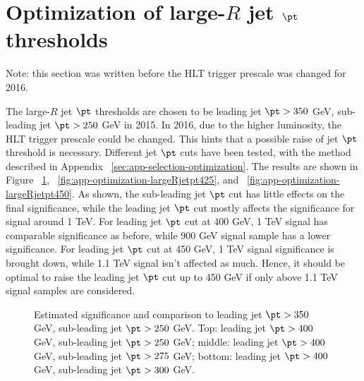 \section{Optimization of large-$R$ jet $\pt$ thresholds}
\label{sec:app-optimization-largeRjetpt}

Note: this section was written before the HLT trigger prescale was changed for 2016.

The large-$R$ jet $\pt$ thresholds are chosen to be leading jet $\pt >  350 $ GeV, sub-leading jet $ \pt >  250 $ GeV in 2015. In 2016, due to the higher luminosity, the HLT trigger prescale could be changed. This hints that a possible raise of jet $\pt$ threshold is necessary. Different jet $\pt$ cuts have been tested, with the method described in Appendix ~\ref{sec:app-selection-optimization}. The results are shown in Figure ~\ref{fig:app-optimization-largeRjetpt400}, ~\ref{fig:app-optimization-largeRjetpt425}, and ~\ref{fig:app-optimization-largeRjetpt450}. As shown, the sub-leading jet $\pt$ cut has little effects on the final significance, while the leading jet $\pt$ cut mostly affects the significance for signal around 1 TeV. For leading jet  $\pt$ cut at 400 GeV, 1 TeV signal has comparable significance as before, while 900 GeV signal sample has a lower significance. For leading jet $\pt$ cut at 450 GeV, 1 TeV signal significance is brought down, while 1.1 TeV signal isn't affected as much. Hence, it should be optimal to raise the leading jet $\pt$ cut up to 450 GeV if only above 1.1 TeV signal samples are considered.

\begin{figure*}[htbp!]
\begin{center}
  \caption{Estimated significance and comparison to leading jet $\pt >  350 $ GeV, sub-leading jet $ \pt >  250 $ GeV. Top: leading jet $\pt >  400 $ GeV, sub-leading jet $ \pt >  250 $ GeV; middle: leading jet $\pt >  400 $ GeV, sub-leading jet $ \pt >  275 $ GeV; bottom: leading jet $\pt >  400 $ GeV, sub-leading jet $ \pt > 300 $ GeV. }
  \label{fig:app-optimization-largeRjetpt400}
\end{center}
\end{figure*}



